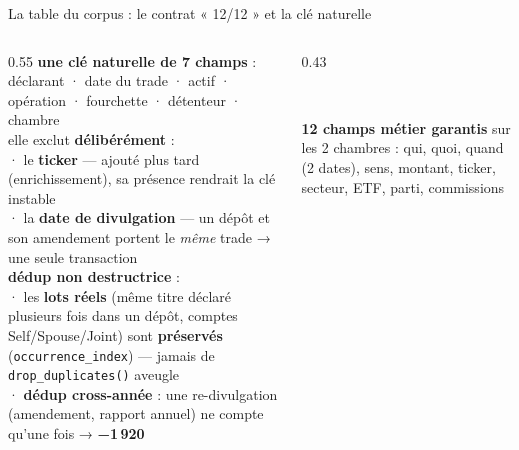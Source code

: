 \documentclass[11pt,aspectratio=169]{beamer}
\newcommand{\co}[1]{\texttt{#1}}
\begin{document}
\begin{frame}{La table du corpus : le contrat « 12/12 » et la clé naturelle}
  \begin{columns}[T]
    \begin{column}{0.55\textwidth}\footnotesize
      \textbf{une clé naturelle de 7 champs} :\\
      {\scriptsize déclarant · date du trade · actif · opération · fourchette ·
       détenteur · chambre}\\[1.5mm]
      {\scriptsize elle exclut \textbf{délibérément} :\\
       · le \textbf{ticker} — ajouté plus tard (enrichissement), sa présence rendrait
         la clé instable\\
       · la \textbf{date de divulgation} — un dépôt et son amendement portent le
         \emph{même} trade → une seule transaction}\\[2mm]
      \textbf{dédup non destructrice} :\\
      {\scriptsize · les \textbf{lots réels} (même titre déclaré plusieurs fois dans un
        dépôt, comptes Self/Spouse/Joint) sont \textbf{préservés}
        (\co{occurrence\_index}) — jamais de \co{drop\_duplicates()} aveugle\\
       · \textbf{dédup cross-année} : une re-divulgation (amendement, rapport annuel)
        ne compte qu'une fois → \textbf{−1\,920}}
    \end{column}
    \begin{column}{0.43\textwidth}
      \centering
      \\[3mm]
      \colorbox{helec}{\parbox{0.9\linewidth}{\footnotesize\color{white}\centering
        \textbf{12 champs métier garantis} sur les 2 chambres : qui, quoi, quand
        (2 dates), sens, montant, ticker, secteur, ETF, parti, commissions}}
    \end{column}
  \end{columns}
\end{frame}
\end{document}
